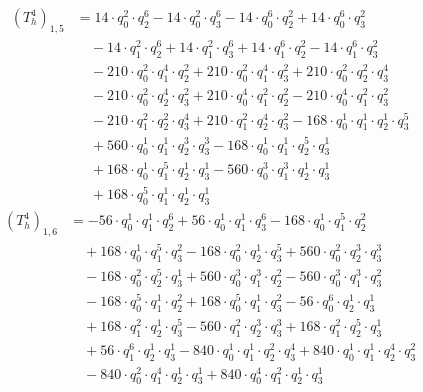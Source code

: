 \begin{align*}(T_{h}^4)_{1,5}&=14\cdot q_0^{2}\cdot q_2^{6}-14\cdot q_0^{2}\cdot q_3^{6}-14\cdot q_0^{6}\cdot q_2^{2}+14\cdot q_0^{6}\cdot q_3^{2}\\
&\quad -14\cdot q_1^{2}\cdot q_2^{6}+14\cdot q_1^{2}\cdot q_3^{6}+14\cdot q_1^{6}\cdot q_2^{2}-14\cdot q_1^{6}\cdot q_3^{2}\\
&\quad -210\cdot q_0^{2}\cdot q_1^{4}\cdot q_2^{2}+210\cdot q_0^{2}\cdot q_1^{4}\cdot q_3^{2}+210\cdot q_0^{2}\cdot q_2^{2}\cdot q_3^{4}\\
&\quad -210\cdot q_0^{2}\cdot q_2^{4}\cdot q_3^{2}+210\cdot q_0^{4}\cdot q_1^{2}\cdot q_2^{2}-210\cdot q_0^{4}\cdot q_1^{2}\cdot q_3^{2}\\
&\quad -210\cdot q_1^{2}\cdot q_2^{2}\cdot q_3^{4}+210\cdot q_1^{2}\cdot q_2^{4}\cdot q_3^{2}-168\cdot q_0^{1}\cdot q_1^{1}\cdot q_2^{1}\cdot q_3^{5}\\
&\quad +560\cdot q_0^{1}\cdot q_1^{1}\cdot q_2^{3}\cdot q_3^{3}-168\cdot q_0^{1}\cdot q_1^{1}\cdot q_2^{5}\cdot q_3^{1}\\
&\quad +168\cdot q_0^{1}\cdot q_1^{5}\cdot q_2^{1}\cdot q_3^{1}-560\cdot q_0^{3}\cdot q_1^{3}\cdot q_2^{1}\cdot q_3^{1}\\
&\quad +168\cdot q_0^{5}\cdot q_1^{1}\cdot q_2^{1}\cdot q_3^{1}\end{align*}
\begin{align*}(T_{h}^4)_{1,6}&=-56\cdot q_0^{1}\cdot q_1^{1}\cdot q_2^{6}+56\cdot q_0^{1}\cdot q_1^{1}\cdot q_3^{6}-168\cdot q_0^{1}\cdot q_1^{5}\cdot q_2^{2}\\
&\quad +168\cdot q_0^{1}\cdot q_1^{5}\cdot q_3^{2}-168\cdot q_0^{2}\cdot q_2^{1}\cdot q_3^{5}+560\cdot q_0^{2}\cdot q_2^{3}\cdot q_3^{3}\\
&\quad -168\cdot q_0^{2}\cdot q_2^{5}\cdot q_3^{1}+560\cdot q_0^{3}\cdot q_1^{3}\cdot q_2^{2}-560\cdot q_0^{3}\cdot q_1^{3}\cdot q_3^{2}\\
&\quad -168\cdot q_0^{5}\cdot q_1^{1}\cdot q_2^{2}+168\cdot q_0^{5}\cdot q_1^{1}\cdot q_3^{2}-56\cdot q_0^{6}\cdot q_2^{1}\cdot q_3^{1}\\
&\quad +168\cdot q_1^{2}\cdot q_2^{1}\cdot q_3^{5}-560\cdot q_1^{2}\cdot q_2^{3}\cdot q_3^{3}+168\cdot q_1^{2}\cdot q_2^{5}\cdot q_3^{1}\\
&\quad +56\cdot q_1^{6}\cdot q_2^{1}\cdot q_3^{1}-840\cdot q_0^{1}\cdot q_1^{1}\cdot q_2^{2}\cdot q_3^{4}+840\cdot q_0^{1}\cdot q_1^{1}\cdot q_2^{4}\cdot q_3^{2}\\
&\quad -840\cdot q_0^{2}\cdot q_1^{4}\cdot q_2^{1}\cdot q_3^{1}+840\cdot q_0^{4}\cdot q_1^{2}\cdot q_2^{1}\cdot q_3^{1}\end{align*}
